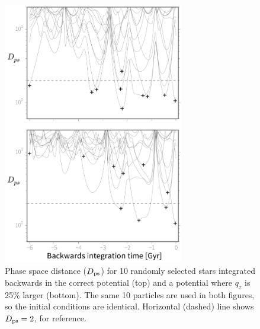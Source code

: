 \begin{figure}[hp!]
\begin{center}
\includegraphics[width=0.7\textwidth,trim=5 0 0 0, clip]{figures/ch1/fig3.pdf}
\caption{Phase space distance ($D_{\rm ps}$) for 10 randomly selected stars integrated backwards in the correct potential (top) and a potential where $q_z$ is 25\% larger (bottom). The same 10 particles are used in both figures, so the initial conditions are identical. Horizontal (dashed) line shows $D_{\rm ps}=2$, for reference.}\label{fig:ps_distance}
\end{center}
\end{figure}

